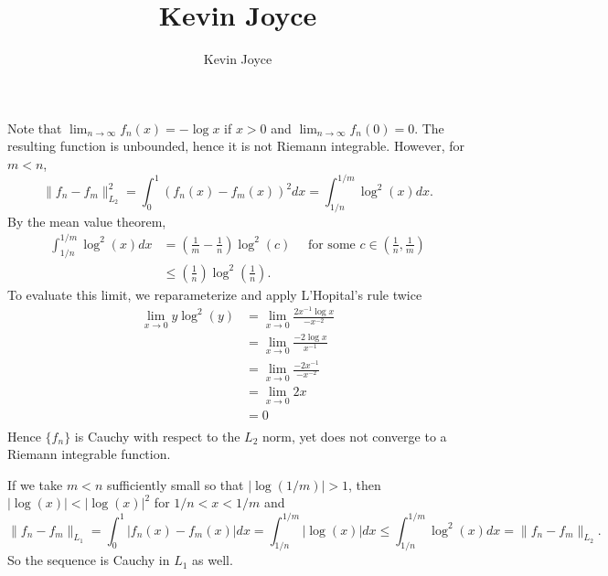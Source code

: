 \documentclass{homework}
\title{Kevin Joyce}
\author{Kevin Joyce}
\begin{document}
 
\newcommand{\figref}[1]{\figurename~\ref{#1}}
\renewcommand{\bar}{\overline}
\renewcommand{\hat}{\widehat}
\renewcommand{\SS}{\mathcal S}
\newcommand{\eps}{\varepsilon}
\newcommand{\TTheta}{\overline{\underline \Theta} }
\newcommand{\del}{\partial}
\newcommand{\approxsim}{\overset{\cdotp}{\underset{\cdotp}{\sim}}}


\begin{solution}
Note that $ \lim_{n\to\infty} f_n(x) = -\log x $ if $x > 0$ and $\lim_{n\to\infty} f_n(0) = 0$. The resulting function is unbounded, hence it is not Riemann integrable. However, for $m<n$,
$$
  \|f_n - f_m\|_{L_2}^2 = \int_0^1 (f_n(x) - f_m(x))^2 dx = \int_{1/n}^{1/m} \log^2(x)dx.
$$ 
By the mean value theorem,
\begin{align*}
\int_{1/n}^{1/m} \log^2(x)dx 
  &= \left(\frac 1m - \frac 1n\right) \log^2(c) \quad\text{ for some }c \in \left(\frac 1n,\frac 1m\right)\\
  &\le \left(\frac 1n \right) \log^2\left(\frac 1n\right).
\end{align*}
To evaluate this limit, we reparameterize and apply L'Hopital's rule twice
\begin{align*}
  \lim_{x\to0} y \log^2(y) 
  &= \lim_{x\to0} \frac{ 2x^{-1} \log x }{-x^{-2}} \\
  &= \lim_{x\to0} \frac{ -2\log x }{x^{-1}} \\
  &= \lim_{x\to0} \frac{ -2 x^{-1}}{-x^{-2}} \\
  &= \lim_{x\to0} 2x \\
  &= 0 \\
\end{align*}
Hence $\{f_n\}$ is Cauchy with respect to the $L_2$ norm, yet does not converge to a Riemann integrable function.  

If we take $m<n$ sufficiently small so that $|\log(1/m)| > 1$, then $|\log(x)| < |\log(x)|^2$ for $1/n<x<1/m$ and 
$$
  \|f_n - f_m\|_{L_1} = \int_0^1 |f_n(x) - f_m(x)| dx = \int_{1/n}^{1/m} |\log(x)|dx \le \int_{1/n}^{1/m} \log^2(x) dx = \|f_n - f_m\|_{L_2}.
$$
So the sequence is Cauchy in $L_1$ as well.

\end{solution}

\end{document}
